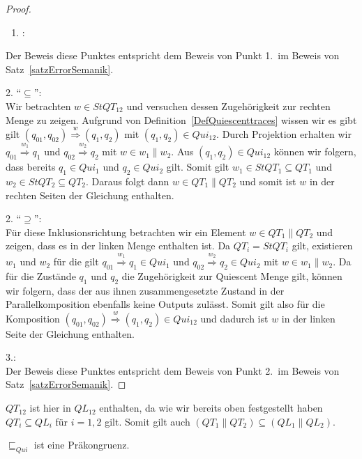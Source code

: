 \begin{proof}
  ~
  \begin{enumerate}
    \item \hspace{-0.2cm}:
  \end{enumerate}
  \vspace{-0.3cm}
  Der Beweis diese Punktes entspricht dem Beweis von Punkt 1.\ im Beweis von
  Satz~\ref{satzErrorSemanik}.

  2. ``$\subseteq$'':\\
  Wir betrachten $w\in StQT_{12}$ und versuchen dessen
  Zugehörigkeit zur rechten Menge zu zeigen. Aufgrund von
  Definition~\ref{DefQuiescenttraces} wissen wir es gibt gilt $(q_{01},q_{02})
  \overset{w}{\Rightarrow} (q_1,q_2)$ mit $(q_1,q_2)\in Qui_{12}$. Durch
  Projektion erhalten wir $q_{01} \overset{w_1}{\Rightarrow} q_1$ und $q_{02}
  \overset{w_2}{\Rightarrow} q_2$ mit $w\in w_1\|w_2$. Aus $(q_1,q_2)\in
  Qui_{12}$ können wir folgern, dass bereits $q_1\in Qui_1$ und $q_2\in
  Qui_2$ gilt. Somit gilt $w_1\in StQT_1\subseteq QT_1$ und $w_2\in
  StQT_2\subseteq QT_2$. Daraus folgt dann $w\in QT_1\|QT_2$ und somit ist $w$
  in der rechten Seiten der Gleichung enthalten.

  2. ``$\supseteq$'':\\
  Für diese Inklusionsrichtung betrachten wir ein Element $w\in QT_1\|QT_2$ und
  zeigen, dass es in der linken Menge enthalten ist. Da $QT_i = StQT_i$ gilt,
  existieren $w_1$ und $w_2$ für die gilt $q_{01} \overset{w_1}{\Rightarrow}
  q_1\in Qui_1$ und $q_{02} \overset{w_2}{\Rightarrow} q_2\in Qui_2$ mit $w\in
  w_1\| w_2$. Da für die Zustände $q_1$ und $q_2$ die Zugehörigkeit zur
  Quiescent Menge gilt, können wir folgern, dass der aus ihnen zusammengesetzte
  Zustand in der Parallelkomposition ebenfalls keine Outputs zulässt. Somit
  gilt also für die Komposition $(q_{01},q_{02}) \overset{w}{\Rightarrow}
  (q_1,q_2)\in Qui_{12}$ und dadurch ist $w$ in der linken Seite der Gleichung
  enthalten.

  3.:\\
  Der Beweis diese Punktes entspricht dem Beweis von Punkt 2.\ im Beweis von
  Satz~\ref{satzErrorSemanik}.
\end{proof}

$QT_{12}$ ist hier in $QL_{12}$ enthalten, da wie wir bereits oben festgestellt
haben $QT_i\subseteq QL_i$ für $i=1,2$ gilt. Somit gilt auch
$(QT_1\|QT_2)\subseteq (QL_1\|QL_2)$.

\begin{prop}[Präkongruenz]
  $\sqsubseteq _{Qui}$ ist eine Präkongruenz.
\end{prop}

